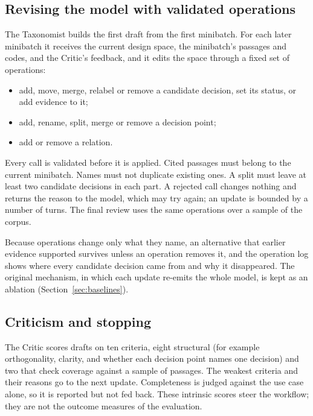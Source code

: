 \documentclass[conference]{IEEEtran}
\providecommand{\tightlist}{\setlength{\itemsep}{0pt}\setlength{\parskip}{0pt}}
\begin{document}
\subsection{Revising the model with validated operations}

The Taxonomist builds the first draft from the first minibatch. For each later minibatch it receives the current design space, the minibatch's passages and codes, and the Critic's feedback, and it edits the space through a fixed set of operations:

\begin{itemize}
\tightlist
\item
  add, move, merge, relabel or remove a candidate decision, set its status, or add evidence to it;
\item
  add, rename, split, merge or remove a decision point;
\item
  add or remove a relation.
\end{itemize}

Every call is validated before it is applied. Cited passages must belong to the current minibatch. Names must not duplicate existing ones. A split must leave at least two candidate decisions in each part. A rejected call changes nothing and returns the reason to the model, which may try again; an update is bounded by a number of turns. The final review uses the same operations over a sample of the corpus.

Because operations change only what they name, an alternative that earlier evidence supported survives unless an operation removes it, and the operation log shows where every candidate decision came from and why it disappeared. The original mechanism, in which each update re-emits the whole model, is kept as an ablation (Section~\ref{sec:baselines}).

\subsection{Criticism and stopping}

The Critic scores drafts on ten criteria, eight structural (for example orthogonality, clarity, and whether each decision point names one decision) and two that check coverage against a sample of passages. The weakest criteria and their reasons go to the next update. Completeness is judged against the use case alone, so it is reported but not fed back. These intrinsic scores steer the workflow; they are not the outcome measures of the evaluation.
\end{document}
